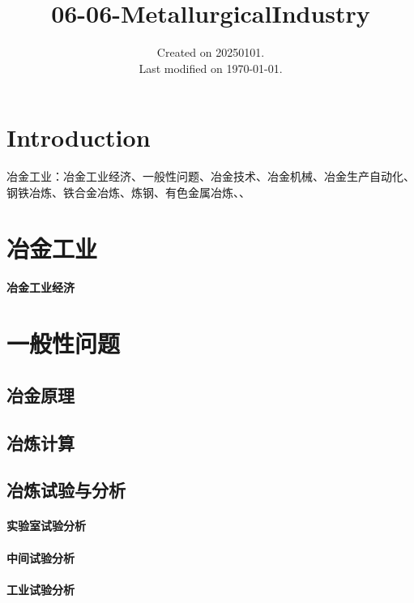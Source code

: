 \documentclass[UTF8]{../../ApplicationUniverse}
\begin{document}
\title{06-06-MetallurgicalIndustry}
\date{Created on 20250101.\\   Last modified on \today.}
\maketitle
\tableofcontents


\chapter{Introduction}

冶金工业：冶金工业经济、一般性问题、冶金技术、冶金机械、冶金生产自动化、钢铁冶炼、铁合金冶炼、炼钢、有色金属冶炼、、






\chapter{冶金工业}
\subsubsection{冶金工业经济}







\chapter{一般性问题}
\section{冶金原理}
\section{冶炼计算}
\section{冶炼试验与分析}
    \subsubsection{实验室试验分析}
    \subsubsection{中间试验分析}
    \subsubsection{工业试验分析}
\end{document}
